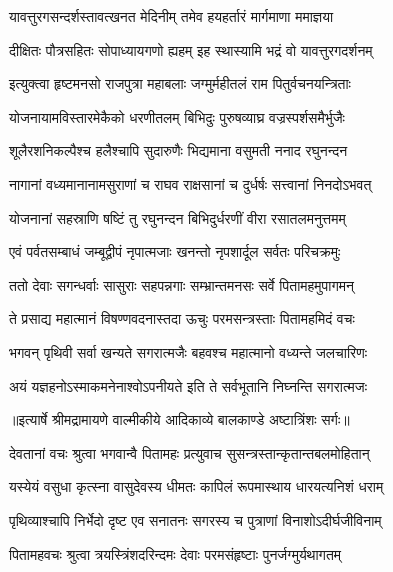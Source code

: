 \addtocounter{shlokacount}{1}

\twolineshloka
{यावत्तुरगसन्दर्शस्तावत्खनत मेदिनीम्}
{तमेव हयहर्तारं मार्गमाणा ममाज्ञया} %

\twolineshloka
{दीक्षितः पौत्रसहितः सोपाध्यायगणो ह्यहम्}
{इह स्थास्यामि भद्रं वो यावत्तुरगदर्शनम्} %

\twolineshloka
{इत्युक्त्वा हृष्टमनसो राजपुत्रा महाबलाः}
{जग्मुर्महीतलं राम पितुर्वचनयन्त्रिताः} %

\twolineshloka
{योजनायामविस्तारमेकैको धरणीतलम्}
{बिभिदुः पुरुषव्याघ्र वज्रस्पर्शसमैर्भुजैः} %

\twolineshloka
{शूलैरशनिकल्पैश्च हलैश्चापि सुदारुणैः}
{भिद्यमाना वसुमती ननाद रघुनन्दन} %

\twolineshloka
{नागानां वध्यमानानामसुराणां च राघव}
{राक्षसानां च दुर्धर्षः सत्त्वानां निनदोऽभवत्} %

\twolineshloka
{योजनानां सहस्राणि षष्टिं तु रघुनन्दन}
{बिभिदुर्धरणीं वीरा रसातलमनुत्तमम्} %

\twolineshloka
{एवं पर्वतसम्बाधं जम्बूद्वीपं नृपात्मजाः}
{खनन्तो नृपशार्दूल सर्वतः परिचक्रमुः} %

\twolineshloka
{ततो देवाः सगन्धर्वाः सासुराः सहपन्नगाः}
{सम्भ्रान्तमनसः सर्वे पितामहमुपागमन्} %

\twolineshloka
{ते प्रसाद्य महात्मानं विषण्णवदनास्तदा}
{ऊचुः परमसन्त्रस्ताः पितामहमिदं वचः} %

\twolineshloka
{भगवन् पृथिवी सर्वा खन्यते सगरात्मजैः}
{बहवश्च महात्मानो वध्यन्ते जलचारिणः} %

\twolineshloka
{अयं यज्ञहनोऽस्माकमनेनाश्वोऽपनीयते}
{इति ते सर्वभूतानि निघ्नन्ति सगरात्मजः} %


{॥इत्यार्षे श्रीमद्रामायणे वाल्मीकीये आदिकाव्ये बालकाण्डे अष्टात्रिंशः सर्गः॥}


\twolineshloka
{देवतानां वचः श्रुत्वा भगवान्वै पितामहः}
{प्रत्युवाच सुसन्त्रस्तान्कृतान्तबलमोहितान्} %

\twolineshloka
{यस्येयं वसुधा कृत्स्ना वासुदेवस्य धीमतः}
{कापिलं रूपमास्थाय धारयत्यनिशं धराम्} %

\twolineshloka
{पृथिव्याश्चापि निर्भेदो दृष्ट एव सनातनः}
{सगरस्य च पुत्राणां विनाशोऽदीर्घजीविनाम्} %

\twolineshloka
{पितामहवचः श्रुत्वा त्रयस्त्रिंशदरिन्दमः}
{देवाः परमसंहृष्टाः पुनर्जग्मुर्यथागतम्} %

